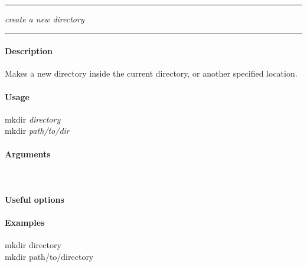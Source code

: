 \hrule
\vspace{1mm}
%
    {\emph{create a new directory}}{}
\hrule
\vspace{4mm}

\paragraph{Description}
\indentpar \raggedright \textrm{Makes a new directory inside the current directory, or another specified location.}\\

\paragraph{Usage}
\indentpar mkdir \textit{directory}\\
\indentpar mkdir \textit{path/to/dir}

\paragraph{Arguments}
\indentpar {}\\
\indentpar {}

\paragraph{Useful options}
\indentpar {}


\paragraph{Examples}

\indentpar mkdir directory\\
\indentpar mkdir path/to/directory

\vspace{20mm}